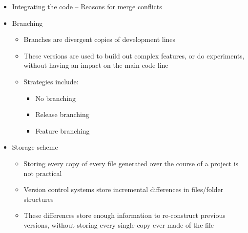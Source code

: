 \begin{itemize}
		\item Integrating the code -- Reasons for merge conflicts
		\vspace{\itemsep}

		\item Branching
		\begin{itemize}
			\item Branches are divergent copies of development lines
			\item These versions are used to build out complex features, or do experiments,
			without having an impact on the main code line
			\item Strategies include:
			\begin{itemize}
				\item No branching
				\item Release branching
				\item Feature branching
			\end{itemize}
		\end{itemize}

		\item Storage scheme
		\begin{itemize}
			\item Storing every copy of every file generated over the course of a project is not practical
			\item Version control systems store incremental differences in files/folder structures
			\item These differences store enough information to re-construct previous versions, without storing every single copy ever made of the file
		\end{itemize}


\end{itemize}
